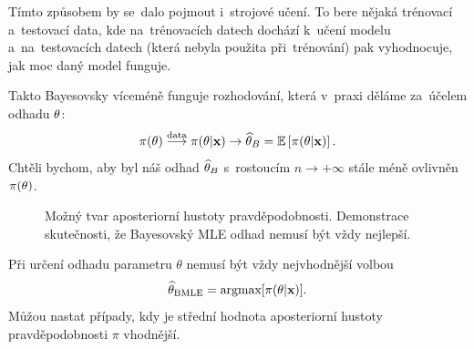 \begin{remark}
	Tímto způsobem by se~dalo pojmout i~strojové učení. To bere nějaká trénovací a~testovací data, kde na~trénovacích datech dochází k~učení modelu a~na~testovacích datech (která nebyla použita při~trénování) pak vyhodnocuje, jak moc daný model funguje.
\end{remark}
Takto Bayesovsky víceméně funguje rozhodování, která v~praxi děláme za~účelem odhadu $\theta$: 
$$ \pi(\theta)\stackrel{\text{data}}{\longrightarrow}\pi(\theta|\textbf{x})\to \widehat{\theta}_B=\mathbb{E}\left[ \pi(\theta|\textbf{x}) \right].$$
Chtěli bychom, aby byl náš odhad $\widehat{\theta}_B$ s~rostoucím $n\to+\infty$ stále méně ovlivněn $\pi(\theta)$.
\begin{figure}[h]
	\centering    
	\caption{Možný tvar aposteriorní hustoty pravděpodobnosti. Demonstrace skutečnosti, že Bayesovský MLE odhad nemusí být vždy nejlepší.}
\end{figure}
\begin{remark}
Při určení odhadu parametru $ \theta $ nemusí být vždy nejvhodnější volbou $$ \widehat{\theta}_{\text{BMLE}} = \text{argmax}[\pi(\theta|\textbf{x})].$$ Můžou nastat případy, kdy je střední hodnota aposteriorní hustoty pravděpodobnosti $ \pi $ vhodnější.
\end{remark}


